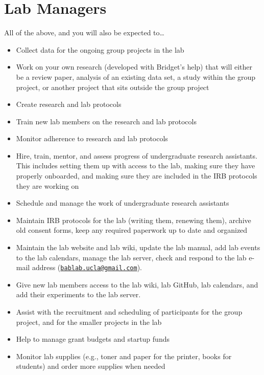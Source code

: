 \documentclass[]{book}
\providecommand{\tightlist}{%
  \setlength{\itemsep}{0pt}\setlength{\parskip}{0pt}}
\begin{document}
\hypertarget{lab-managers}{%
\section{Lab Managers}\label{lab-managers}}

All of the above, and you will also be expected to\ldots{}

\begin{itemize}
\tightlist
\item
  Collect data for the ongoing group projects in the lab
\item
  Work on your own research (developed with Bridget's help) that will either be a review paper, analysis of an existing data set, a study within the group project, or another project that sits outside the group project
\item
  Create research and lab protocols
\item
  Train new lab members on the research and lab protocols
\item
  Monitor adherence to research and lab protocols
\item
  Hire, train, mentor, and assess progress of undergraduate research assistants. This includes setting them up with access to the lab, making sure they have properly onboarded, and making sure they are included in the IRB protocols they are working on
\item
  Schedule and manage the work of undergraduate research assistants
\item
  Maintain IRB protocols for the lab (writing them, renewing them), archive old consent forms, keep any required paperwork up to date and organized
\item
  Maintain the lab website and lab wiki, update the lab manual, add lab events to the lab calendars, manage the lab server, check and respond to the lab e-mail address (\href{mailto:bablab.ucla@gmail.com}{\nolinkurl{bablab.ucla@gmail.com}}).
\item
  Give new lab members access to the lab wiki, lab GitHub, lab calendars, and add their experiments to the lab server.
\item
  Assist with the recruitment and scheduling of participants for the group project, and for the smaller projects in the lab
\item
  Help to manage grant budgets and startup funds
\item
  Monitor lab supplies (e.g., toner and paper for the printer, books for students) and order more supplies when needed
\end{itemize}
\end{document}
